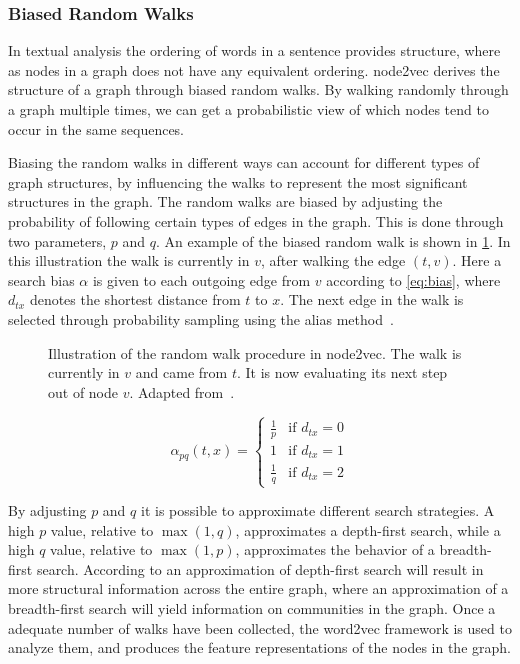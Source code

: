 \subsubsection{Biased Random Walks}
In textual analysis the ordering of words in a sentence provides structure, where as nodes in a graph does not have any equivalent ordering. node2vec derives the structure of a graph through biased random walks. By walking randomly through a graph multiple times, we can get a probabilistic view of which nodes tend to occur in the same sequences.

Biasing the random walks in different ways can account for different types of graph structures, by influencing the walks to represent the most significant structures in the graph. The random walks are biased by adjusting the probability of following certain types of edges in the graph. This is done through two parameters, $p$ and $q$. An example of the biased random walk is shown in \cref{fig:randomwalk}. In this illustration the walk is currently in $v$, after walking the edge $(t,v)$. Here a search bias $\alpha$ is given to each outgoing edge from $v$ according to \cref{eq:bias}, where $d_{tx}$ denotes the shortest distance from $t$ to $x$. The next edge in the walk is selected through probability sampling using the alias method~\cite{alias-method}. 

\begin{figure}%
  \centering
  
\caption[Illustration of random walk in node2vec]{Illustration of the random walk procedure in node2vec. The walk is currently in $v$ and came from $t$. It is now evaluating its next step out of node $v$. Adapted from~\cite{node2vec}.}%
\label{fig:randomwalk}%
\end{figure}

\begin{equation}
\label{eq:bias}
\alpha_{pq}(t,x)=
\begin{cases}
  \frac{1}{p} & \text{if } d_{tx}=0 \\
  1           & \text{if } d_{tx}=1 \\
  \frac{1}{q} & \text{if } d_{tx}=2
\end{cases}
\end{equation}

By adjusting $p$ and $q$ it is possible to approximate different search strategies. A high $p$ value, relative to $\max(1,q)$, approximates a depth-first search, while a high $q$ value, relative to $\max(1,p)$, approximates the behavior of a breadth-first search. According to \cite{node2vec} an approximation of depth-first search will result in more structural information across the entire graph, where an approximation of a breadth-first search will yield information on communities in the graph.
Once a adequate number of walks have been collected, the word2vec framework is used to analyze them, and produces the feature representations of the nodes in the graph.